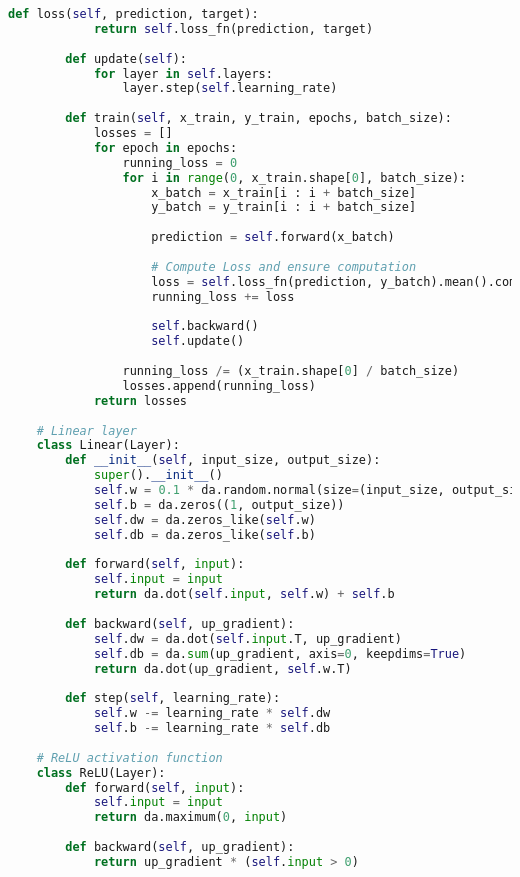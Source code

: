 \documentclass[12pt,letterpaper]{article}
\begin{document}
\begin{lstlisting}[language=Python, frame=single, breaklines=true]
        def loss(self, prediction, target):
            return self.loss_fn(prediction, target)
    
        def update(self):
            for layer in self.layers:
                layer.step(self.learning_rate)
    
        def train(self, x_train, y_train, epochs, batch_size):
            losses = []
            for epoch in epochs:
                running_loss = 0
                for i in range(0, x_train.shape[0], batch_size):
                    x_batch = x_train[i : i + batch_size]
                    y_batch = y_train[i : i + batch_size]
    
                    prediction = self.forward(x_batch)
    
                    # Compute Loss and ensure computation
                    loss = self.loss_fn(prediction, y_batch).mean().compute()
                    running_loss += loss
    
                    self.backward()
                    self.update()
    
                running_loss /= (x_train.shape[0] / batch_size)
                losses.append(running_loss)
            return losses
    
    # Linear layer
    class Linear(Layer):
        def __init__(self, input_size, output_size):
            super().__init__()
            self.w = 0.1 * da.random.normal(size=(input_size, output_size))
            self.b = da.zeros((1, output_size))
            self.dw = da.zeros_like(self.w)
            self.db = da.zeros_like(self.b)
    
        def forward(self, input):
            self.input = input
            return da.dot(self.input, self.w) + self.b
    
        def backward(self, up_gradient):
            self.dw = da.dot(self.input.T, up_gradient)
            self.db = da.sum(up_gradient, axis=0, keepdims=True)
            return da.dot(up_gradient, self.w.T)
    
        def step(self, learning_rate):
            self.w -= learning_rate * self.dw
            self.b -= learning_rate * self.db
    
    # ReLU activation function
    class ReLU(Layer):
        def forward(self, input):
            self.input = input
            return da.maximum(0, input)
    
        def backward(self, up_gradient):
            return up_gradient * (self.input > 0)
    

\end{lstlisting}
\end{document}
